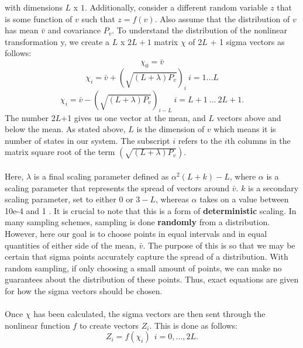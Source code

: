 \documentclass{article}
\begin{document}
    with dimensions $L$ x $1$. Additionally, consider a different random variable $z$ that is some function of $v$ such that $z = f(v)$. Also assume that the distribution of $v$ has mean $\bar{v}$ and covariance $P_v$. To understand the distribution of the nonlinear transformation y, we create a $L$ x $2L+1$ matrix $\chi$ of 2$L$ + 1 sigma vectors as follows:
    \begin{equation} \label{eq:UT_1}
    \chi_0 = \bar{v}
    \end{equation}
    \begin{equation} \label{eq:UT_2}
    \chi_i = \bar{v} + (\sqrt{(L + \lambda)P_v})_i \ i = 1 ... L
    \end{equation}
    \begin{equation} \label{eq:UT_3}
    \chi_i = \bar{v} - (\sqrt{(L + \lambda)P_v})_{i - L} \ i = L + 1 \  ...  \ 2L + 1.
    \end{equation}
    The number 2$L$+1 gives us one vector at the mean, and $L$ vectors above and below the mean. As stated above, $L$ is the dimension of $v$ which means it is number of states in our system. The subscript $i$ refers to the $i$th columns in the matrix square root of the term $(\sqrt{(L + \lambda)P_v})$.\\
    \\
    Here, $\lambda$ is a final scaling parameter defined as $\alpha^2(L + k) - L$, where $\alpha$ is a scaling parameter that represents the spread of vectors around $\bar{v}$. $k$ is a secondary scaling parameter, set to either 0 or $3-L$, whereas $\alpha$ takes on a value between 10e-4 and 1 \cite{VanMereChapter}. It is crucial to note that this is a form of \textbf{deterministic} scaling. In many sampling schemes, sampling is done \textbf{randomly} from a distribution. However, here our goal is to choose points in equal intervals and in equal quantities of either side of the mean, $\bar{v}$. The purpose of this is so that we may be certain that sigma points accurately capture the spread of a distribution. With random sampling, if only choosing a small amount of points, we can make no guarantees about the distribution of these points. Thus, exact equations are given for how the sigma vectors should be chosen. \\
    \\
    Once $\chi$ has been calculated, the sigma vectors are then sent through the nonlinear function $f$ to create vectors $Z_i$. This is done as follows:
    \begin{equation}
    Z_i = f(\chi_i) \ \ i = 0,...,2L.
    \end{equation}
    
\end{document}
